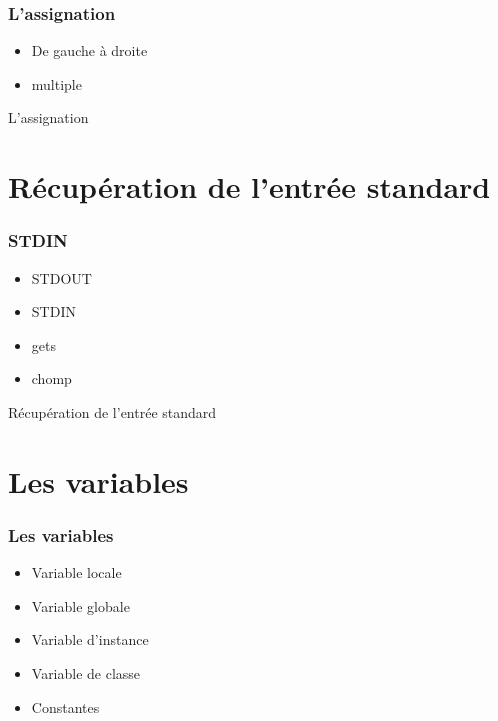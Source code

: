 \documentclass{beamer}
\begin{document}
\begin{frame}
  \frametitle{L'assignation}
  \begin{itemize}
    \item De gauche à droite
    \item multiple
  \end{itemize}
\end{frame}

\begin{frame}
  \begin{beamerboxesrounded}{L'assignation}
    
  \end{beamerboxesrounded}
\end{frame}

\section{Récupération de l'entrée standard}

\begin{frame}
  \frametitle{STDIN}
  \begin{itemize}
    \item STDOUT
    \item STDIN
    \item gets
    \item chomp
  \end{itemize}
\end{frame}

\begin{frame}
  \begin{beamerboxesrounded}{R\'ecup\'eration de l'entr\'ee standard}
    
  \end{beamerboxesrounded}
\end{frame}

\section{Les variables}

\begin{frame}
  \frametitle{Les variables}
  \begin{itemize}
    \item Variable locale
    \item Variable globale
    \item Variable d'instance
    \item Variable de classe
    \item Constantes
  \end{itemize}
\end{frame}
\end{document}
